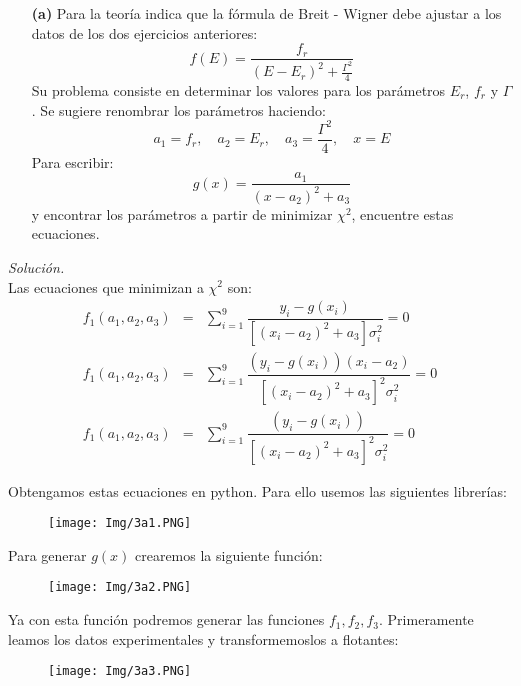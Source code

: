 \documentclass[11pt]{article}
\begin{document}
\begin{enumerate}
	\item [\textbf{(a)}] Para la teoría indica que la fórmula de Breit - Wigner  debe ajustar a los datos de los dos ejercicios anteriores:
	\begin{equation}\label{Breit}
		f(E) = \frac{f_r}{(E - E_r)^2 + \frac{\Gamma^2}{4}}
	\end{equation}
	Su problema consiste en determinar los valores para los parámetros $E_r$, $f_r$ y $\Gamma$. Se sugiere renombrar los parámetros haciendo:
	$$a_1 = f_r,\quad a_2= E_r, \quad a_3 = \frac{\Gamma^2}{4},\quad x=E$$
	Para escribir:
	\begin{equation}\label{xi}
		g(x) =\frac{a_1}{(x-a_2)^2 + a_3}
	\end{equation}
	y encontrar los parámetros a partir de minimizar $\chi^2$, encuentre estas ecuaciones.
\end{enumerate}
\textit{Solución.}\\
	Las ecuaciones que minimizan a $\chi^2$ son: 
	\begin{eqnarray}
		f_1(a_1, a_2, a_3) &=& \sum_{i=1}^{9} \dfrac{y_i - g(x_i)}{\left[ (x_i - a_2)^2 + a_3\right] \sigma_i^2} = 0  \\
		f_1(a_1, a_2, a_3) &=& \sum_{i=1}^{9} \dfrac{(y_i - g(x_i)) (x_i - a_2)}{\left[ (x_i - a_2)^2 + a_3\right]^2 \sigma_i^2} = 0  \\
		f_1(a_1, a_2, a_3) &=& \sum_{i=1}^{9} \dfrac{(y_i - g(x_i))}{\left[ (x_i - a_2)^2 + a_3\right]^2 \sigma_i^2} = 0  
	\end{eqnarray}

	Obtengamos estas ecuaciones en python. Para ello usemos las siguientes librerías:
	\begin{figure}[h]
		\centering
		\texttt{[image: Img/3a1.PNG]}
	\end{figure}

	Para generar $g(x)$ crearemos la siguiente función:
	\begin{figure}[h]
		\centering
		\texttt{[image: Img/3a2.PNG]}
	\end{figure}
	
	Ya con esta función podremos generar las funciones $f_1,f_2,f_3$. Primeramente leamos los datos experimentales y transformemoslos a flotantes:
\newpage	
	\begin{figure}[h!]
		\centering
		\texttt{[image: Img/3a3.PNG]}
	\end{figure}
\end{document}
